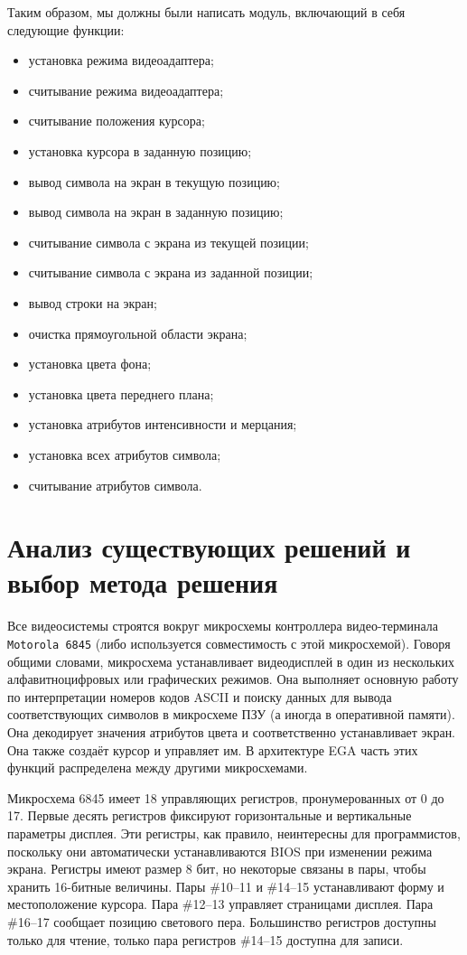 \documentclass[a4paper,12pt,notitlepage,pdftex,headsepline]{scrartcl}
\begin{document}
Таким образом, мы должны были написать модуль, включающий в себя следующие функции:
\begin{itemize}
\item установка режима видеоадаптера;
\item считывание режима видеоадаптера;
\item считывание положения курсора;
\item установка курсора в заданную позицию;
\item вывод символа на экран в текущую позицию;
\item вывод символа на экран в заданную позицию;
\item считывание символа с экрана из текущей позиции;
\item считывание символа с экрана из заданной позиции;
\item вывод строки на экран;
\item очистка прямоугольной области экрана;
\item установка цвета фона;
\item установка цвета переднего плана;
\item установка атрибутов интенсивности и мерцания;
\item установка всех атрибутов символа;
\item считывание атрибутов символа.
\end{itemize}
\newpage
\section{Анализ существующих решений и выбор метода решения}
Все видеосистемы строятся вокруг микросхемы контроллера видео-терминала \texttt{Motorola 6845} (либо используется совместимость с этой микросхемой).
Говоря общими словами, микросхема устанавливает видеодисплей в один из нескольких алфавитноцифровых или графических режимов.
Она выполняет основную работу по интерпретации номеров кодов ASCII и поиску данных для вывода соответствующих символов в микросхеме ПЗУ (а иногда в оперативной памяти).
Она декодирует значения атрибутов цвета и соответственно устанавливает экран.
Она также создаёт курсор и управляет им.
В архитектуре EGA часть этих функций распределена между другими микросхемами.

Микросхема 6845 имеет 18 управляющих регистров, пронумерованных от 0 до 17.
Первые десять регистров фиксируют горизонтальные и вертикальные параметры дисплея.
Эти регистры, как правило, неинтересны для программистов, поскольку они автоматически устанавливаются BIOS при изменении режима экрана.
Регистры имеют размер 8 бит, но некоторые связаны в пары, чтобы хранить 16-битные величины.
Пары \#10--11 и \#14--15 устанавливают форму и местоположение курсора.
Пара \#12--13 управляет страницами дисплея.
Пара \#16--17 сообщает позицию светового пера.
Большинство регистров доступны только для чтение, только пара регистров \#14--15 доступна для записи.
\end{document}
